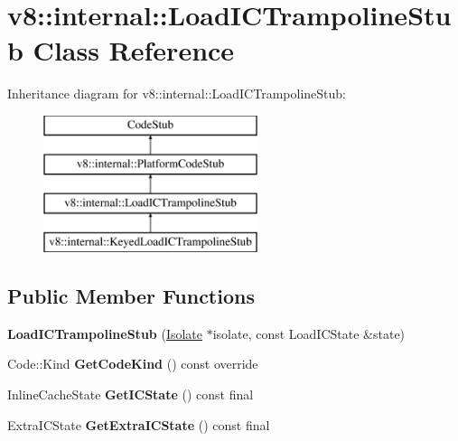 \hypertarget{classv8_1_1internal_1_1_load_i_c_trampoline_stub}{}\section{v8\+:\+:internal\+:\+:Load\+I\+C\+Trampoline\+Stub Class Reference}
\label{classv8_1_1internal_1_1_load_i_c_trampoline_stub}
Inheritance diagram for v8\+:\+:internal\+:\+:Load\+I\+C\+Trampoline\+Stub\+:\begin{figure}[H]
\begin{center}
\leavevmode
\includegraphics[height=4.000000cm]{classv8_1_1internal_1_1_load_i_c_trampoline_stub}
\end{center}
\end{figure}
\subsection*{Public Member Functions}
\begin{DoxyCompactItemize}
\item 
{\bfseries Load\+I\+C\+Trampoline\+Stub} (\hyperlink{classv8_1_1internal_1_1_isolate}{Isolate} $\ast$isolate, const Load\+I\+C\+State \&state)\hypertarget{classv8_1_1internal_1_1_load_i_c_trampoline_stub_a74e31b95cacf9c1eb691eaf473a0017a}{}\label{classv8_1_1internal_1_1_load_i_c_trampoline_stub_a74e31b95cacf9c1eb691eaf473a0017a}

\item 
Code\+::\+Kind {\bfseries Get\+Code\+Kind} () const  override\hypertarget{classv8_1_1internal_1_1_load_i_c_trampoline_stub_a6f22eaff4b5c7369048b997f87fed52c}{}\label{classv8_1_1internal_1_1_load_i_c_trampoline_stub_a6f22eaff4b5c7369048b997f87fed52c}

\item 
Inline\+Cache\+State {\bfseries Get\+I\+C\+State} () const  final\hypertarget{classv8_1_1internal_1_1_load_i_c_trampoline_stub_a15ae65111555a27658e758130e07c85a}{}\label{classv8_1_1internal_1_1_load_i_c_trampoline_stub_a15ae65111555a27658e758130e07c85a}

\item 
Extra\+I\+C\+State {\bfseries Get\+Extra\+I\+C\+State} () const  final\hypertarget{classv8_1_1internal_1_1_load_i_c_trampoline_stub_ab95ffda38d3f152ef6f61919debbd986}{}\label{classv8_1_1internal_1_1_load_i_c_trampoline_stub_ab95ffda38d3f152ef6f61919debbd986}

\end{DoxyCompactItemize}
